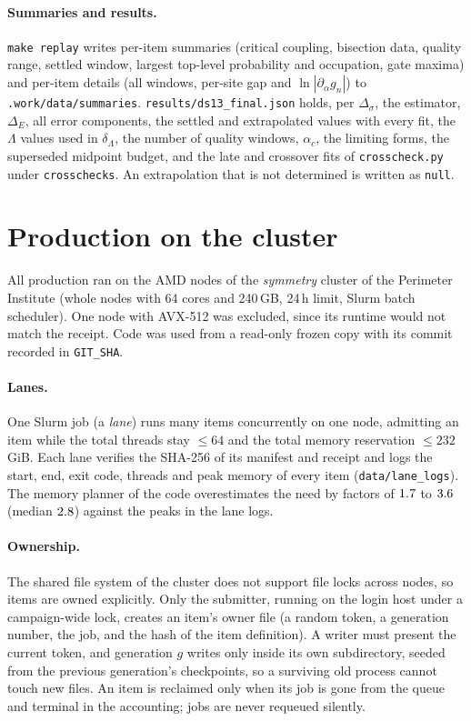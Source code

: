 \documentclass[10pt,a4paper]{article}
\newcommand{\Ds}{\Delta_\sigma}
\newcommand{\DE}{\Delta_E}
\newcommand{\code}[1]{\texttt{#1}}
\newcommand{\dL}{\delta_\Lambda}
\begin{document}
\paragraph{Summaries and results.} \code{make replay} writes per-item summaries (critical coupling, bisection data, quality range,
settled window, largest top-level probability and occupation, gate maxima) and per-item details (all windows, per-site gap and
$\ln|\partial_\alpha g_n|$) to \code{.work/data/summaries}. \code{results/ds13\_final.json} holds, per $\Ds$, the estimator, $\DE$,
all error components, the settled and extrapolated values with every fit, the $\Lambda$ values used in $\dL$, the number of quality
windows, $\alpha_c$, the limiting forms, the superseded midpoint budget, and the late and crossover fits of \code{crosscheck.py}
under \code{crosschecks}. An extrapolation that is not determined is written as \code{null}.

\section{Production on the cluster}\label{app:cluster}
All production ran on the AMD nodes of the \emph{symmetry} cluster of the Perimeter Institute (whole nodes with 64 cores and 240\,GB,
24\,h limit, Slurm batch scheduler). One node with AVX-512 was excluded, since its runtime would not match the receipt. Code was used
from a read-only frozen copy with its commit recorded in \code{GIT\_SHA}.

\paragraph{Lanes.} One Slurm job (a \emph{lane}) runs many items concurrently on one node, admitting an item while the total threads
stay $\le64$ and the total memory reservation $\le232$\,GiB. Each lane verifies the SHA-256 of its manifest and receipt and logs the
start, end, exit code, threads and peak memory of every item (\code{data/lane\_logs}). The memory planner of the code overestimates
the need by factors of $1.7$ to $3.6$ (median $2.8$) against the peaks in the lane logs.

\paragraph{Ownership.} The shared file system of the cluster does not support file locks across nodes, so items are owned
explicitly. Only the submitter, running on the login host under a campaign-wide lock, creates an item's owner file (a random token,
a generation number, the job, and the hash of the item definition). A writer must present the current token, and generation $g$
writes only inside its own subdirectory, seeded from the previous generation's checkpoints, so a surviving old process cannot touch
new files. An item is reclaimed only when its job is gone from the queue and terminal in the accounting; jobs are never requeued
silently.
\end{document}
